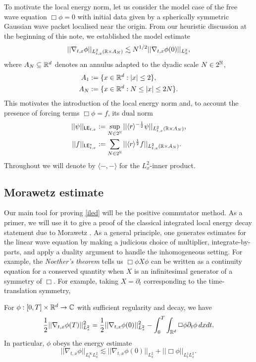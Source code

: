 

To motivate the local energy norm, let us consider the model case of the free wave equation $\Box \phi = 0$ with initial data given by a spherically symmetric Gaussian wave packet localised near the origin. From our heuristic discussion at the beginning of this note, we established the model estimate
	\[
		||  \nabla_{t, x} \phi||_{L^2_{t, x} (\mathbb R \times A_N)} \lesssim N^{1/2} ||\nabla_{t, x} \phi (0)||_{L^2_x},
	\]
where $A_N \subseteq \mathbb R^d$ denotes an annulus adapted to the dyadic scale $N \in 2^\mathbb N$, 
	\begin{align*}
		A_1
			&:= \{ x \in \mathbb R^d : |x| \leq 2\}, \\
		A_N
			&:= \{ x \in \mathbb R^d : N \leq |x| \leq 2N \}.
	\end{align*}
This motivates the introduction of the local energy norm and, to account the presence of forcing terms $\Box \phi = f$, its dual norm
	\begin{align*}
		||\psi||_{\mathsf{LE}_{t, x}}
			&:= \sup_{N \in 2^\mathbb N} ||\langle r \rangle^{-\frac12} \psi||_{L^2_{t, x} (\mathbb R \times A_N)},\\
		||f||_{\mathsf{LE}^*_{t, x}}
			&:= \sum_{N \in 2^\mathbb N} || \langle r \rangle^{\frac12} f||_{L^2_{t, x} (\mathbb R \times A_N)}.	
	\end{align*}
Throughout we will denote by $\langle -, - \rangle$ for the $L^2_x$-inner product. 	

\subsection{Morawetz estimate}

Our main tool for proving \eqref{iled} will be the positive commutator method. As a primer, we will use it to give a proof of the classical integrated local energy decay statement due to Morawetz \cite{Morawetz1997}. As a general principle, one generates estimates for the linear wave equation by making a judicious choice of multiplier, integrate-by-parts, and apply a duality argument to handle the inhomogeneous setting. For example, the \textit{Noether's theorem} tells us $\Box \phi X \phi$ can be written as a continuity equation for a conserved quantity when $X$ is an infinitesimal generator of a symmetry of $\Box$. For example, taking $X = \partial_t$ corresponding to the time-translation symmetry, 

\begin{proposition}\label{lem:energy}
	For $\phi : [0, T] \times \mathbb R^d \to \mathbb C$ with sufficient regularity and decay, we have
		\[
			\frac12 ||\nabla_{t, x} \phi(T)||_{L^2_x}^2 = \frac12 ||\nabla_{t, x}\phi(0)||_{L^2_x}^2 - \int_0^T \int_{\mathbb R^d} \Box \phi \partial_t \phi \, dx dt. 
		\]
	In particular, $\phi$ obeys the energy estimate
		\[
			||\nabla_{t, x} \phi||_{L^\infty_t L^2_x} \lesssim ||\nabla_{t, x}\phi(0)||_{L^2_x} + ||\Box \phi||_{L^1_t L^2_x}.
		\]	
\end{proposition}

